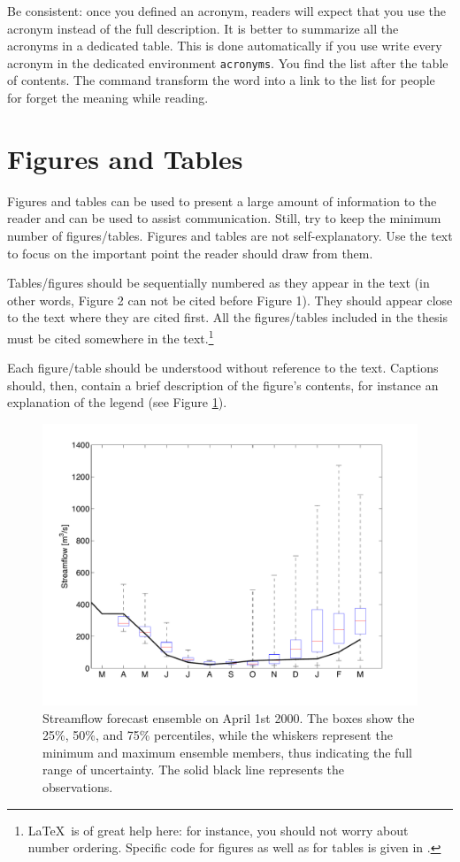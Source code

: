 Be consistent: once you defined an acronym, readers will expect that you use the acronym instead of the full description.
It is better to summarize all the acronyms in a dedicated table.
This is done automatically if you use write every acronym in the dedicated environment \verb!acronyms!.
You find the list after the table of contents.
The command transform the word into a link to the list for people for forget the meaning while reading.

\section{Figures and Tables}\label{sec:fig_and_tab}
Figures and tables can be used to present a large amount of information to the reader and can be used to assist communication.
Still, try to keep the minimum number of figures/tables.
Figures and tables are not self-explanatory. 
Use the text to focus on the important point the reader should draw from them.

Tables/figures should be sequentially numbered as they appear in the text (in other words, Figure 2 can not be cited before Figure 1).
They should appear close to the text where they are cited first.
All the figures/tables included in the thesis must be cited somewhere in the text.\footnote{\LaTeX\ is of great help here: for instance, you should not worry about number ordering. Specific code for figures as well as for tables is given in .}

Each figure/table should be understood without reference to the text.
Captions should, then, contain a brief description of the figure's contents, for instance an explanation of the legend (see Figure \ref{fig:boxplot_quality}).

\begin{figure}[htbp]
\centering
\includegraphics[width=\columnwidth]{Images/Introduction_Writing/boxplot_ensemble_2000.pdf} 
\caption[Streamflow forecast ensemble on April 1st 2000]{Streamflow forecast ensemble on April 1st 2000. The boxes show the 25\%, 50\%, and 75\% percentiles, while the whiskers represent the minimum and maximum ensemble members, thus indicating the full range of uncertainty. The solid black line represents the observations.}
\label{fig:boxplot_quality}
\end{figure}

